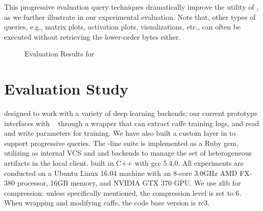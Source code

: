 \documentclass[conference]{IEEEtran}
\begin{document}
This progressive evaluation query techniques dramatically improve the utility of \weightstore, as we further illustrate in our experimental evaluation. 
Note that, other types of queries, e.g., matrix plots, activation plots, visualizations, etc., can often be executed without retrieving the lower-order bytes either.

\begin{figure*}[!t]
\caption{Evaluation Results for \weightstore}
\label{fig:paseval}
\end{figure*}



\section{Evaluation Study}
\label{sec:experiments}
\modelhub\is designed to work with a variety of deep learning backends; our
current prototype interfaces with ~\cite{caffe2014mm} through a wrapper that can
extract caffe training logs, and read and write parameters for training. We have
also built a custom layer in  to support progressive queries. 
The \dlv\command-line suite is implemented as a Ruby
gem, utilizing  as internal VCS and  and \weightstore\as
backends to manage the set of heterogeneous artifacts in the local client.
\weightstore\is built in C++ with gcc 5.4.0. All experiments are conducted on a
Ubuntu Linux 16.04 machine with an 8-core 3.0GHz AMD FX-380 processor, 16GB
memory,
and NVIDIA GTX 370 GPU. We use zlib for compression; unless
specifically mentioned, the compression level is set to 6. When wrapping
and modifying caffe, the code base version is rc3.
\end{document}
